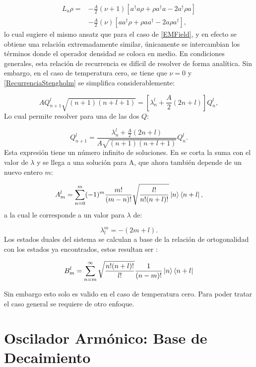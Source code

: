 \documentclass[a4paper,10pt]{report}
\begin{document}
\begin{align}
L_a \rho =& - \frac{A}{2}(\nu + 1)[a^\dagger a\rho + \rho a^\dagger a -2a^\dagger\rho a] \nonumber \\
 &- \frac{A}{2}(\nu)[ aa^\dagger\rho + \rho  aa^\dagger -2a\rho a^\dagger],
\end{align} lo cual sugiere el mismo ansatz que para el caso de \ref{EMField}, y en efecto se obtiene una relación extremadamente similar, únicamente se intercambian los términos donde el operador densidad se coloca en medio. En condiciones generales, esta relación de recurrencia es difícil de resolver de forma analítica. Sin embargo, en el caso de temperatura cero, se tiene que $\nu = 0$ y \ref{RecurrenciaStengholm} se simplifica considerablemente:

\begin{equation}
AQ_{n+1}^l\sqrt{(n+1)(n+l+1)}=[\lambda_n^l + \frac{A}{2}(2n+l)]Q_n^l,
\end{equation} Lo cual permite resolver para una de las dos $Q$:

\begin{equation}
Q_{n+1}^l = \frac{\lambda_n^l + \frac{A}{2}(2n+l)}{A\sqrt{(n+1)(n+l+1)}}Q_n^l.
\end{equation}Esta expresión tiene un número infinito de soluciones. En \cite{BarnettSD} se corta la suma con el valor de $\lambda$ y se llega a una solución para A, que ahora también depende de un nuevo entero $m$:

\begin{equation}
A_m^l = \sum_{n=0}^m (-1)^m \frac{m!}{(m-n)!}\sqrt{\frac{l!}{n!(n+l)!}}\Ket{n}\Bra{n+l},
\end{equation} a la cual le corresponde a un valor para $\lambda$ de:

\begin{equation}
\lambda_l^m = -(2m+l).
\end{equation} Los estados duales del sistema se calculan a base de la relación de ortogonalidad con los estados ya encontrados, estos resultan ser \cite{BarnettSD}:

\begin{equation}
B_m^l = \sum_{n=m}^\infty \sqrt{\frac{n!(n+l)!}{l!}}\frac{1}{(n-m)!}\Ket{n}\Bra{n+l}
\end{equation}

Sin embargo esto solo es valido en el caso de temperatura cero. Para poder tratar el caso general se requiere de otro enfoque.

\section{Oscilador Armónico: Base de Decaimiento}
\end{document}
